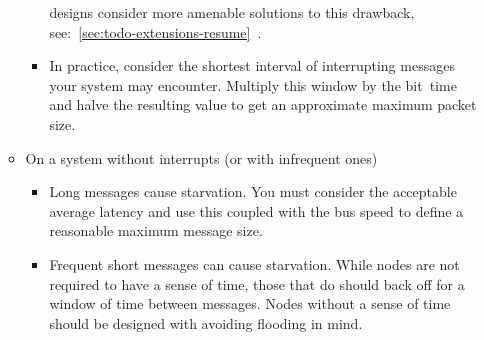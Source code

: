 \begin{itemize}
\begin{itemize}
\begin{itemize}
            designs consider more amenable solutions to this drawback,
            see:~\ref{sec:todo-extensions-resume}~.
      \item In practice, consider the shortest interval of interrupting
            messages your system may encounter. Multiply this window by the
            bit~time and halve the resulting value to get an approximate
            maximum packet size.
    \end{itemize}
    \item On a system without interrupts (or with infrequent ones)
    \begin{itemize}
      \item Long messages cause starvation. You must consider the acceptable
            average latency and use this coupled with the bus speed to define
            a reasonable maximum message size.
      \item Frequent short messages can cause starvation. While nodes are not
            required to have a sense of time, those that do should back off
            for a window of time between messages. Nodes without a sense of
            time should be designed with avoiding flooding in mind.
    \end{itemize}
  \end{itemize}
\end{itemize}


